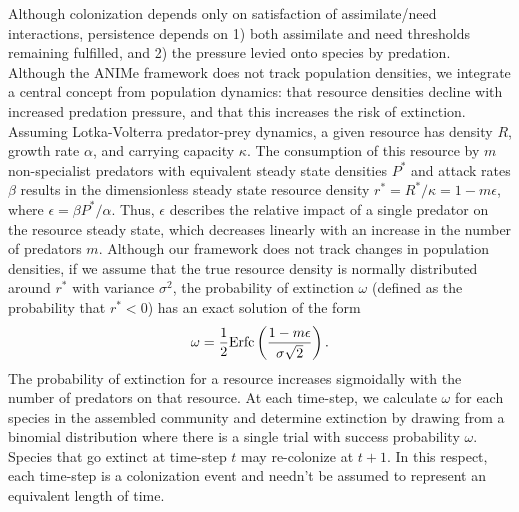 \documentclass[twocolumn,preprintnumbers,amsmath,amssymb,superscriptaddress]{revtex4}
\begin{document}
Although colonization depends only on satisfaction of assimilate/need interactions, persistence depends on
1) both assimilate and need thresholds remaining fulfilled, and
2) the pressure levied onto species by predation.
Although the ANIMe framework does not track population densities, we integrate a central concept from population dynamics: that resource densities decline with increased predation pressure, and that this increases the risk of extinction.
Assuming Lotka-Volterra predator-prey dynamics, a given resource has density $R$, growth rate $\alpha$, and carrying capacity $\kappa$.
The consumption of this resource by $m$ non-specialist predators with equivalent steady state densities $P^*$ and attack rates $\beta$ results in the dimensionless steady state resource density $r^* = R^*/\kappa = 1 - m\epsilon$, where $\epsilon=\beta P^*/\alpha$.
Thus, $\epsilon$ describes the relative impact of a single predator on the resource steady state, which decreases linearly with an increase in the number of predators $m$.
Although our framework does not track changes in population densities, if we assume that the true resource density is normally distributed around $r^*$ with variance $\sigma^2$, the probability of extinction $\omega$ (defined as the probability that $r^* < 0$) has an exact solution of the form
\begin{equation}
  \omega = \frac{1}{2}{\rm Erfc}\left(\frac{1-m\epsilon}{\sigma\sqrt{2}}\right).
\end{equation}
The probability of extinction for a resource increases sigmoidally with the number of predators on that resource.
At each time-step, we calculate $\omega$ for each species in the assembled community and determine extinction by drawing from a binomial distribution where there is a single trial with success probability $\omega$.
Species that go extinct at time-step $t$ may re-colonize at $t+1$.
In this respect, each time-step is a colonization event and needn't be assumed to represent an equivalent length of time.
\end{document}
